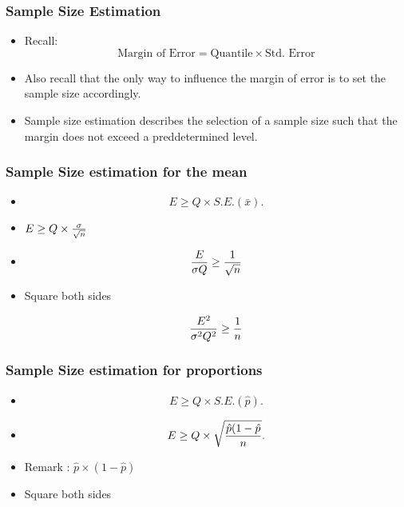 
\begin{frame}
\frametitle{Sample Size Estimation}

\begin{itemize} \item Recall:
\[  \mbox{Margin of Error}  = \mbox{Quantile} \times \mbox{Std. Error}\]

\item Also recall that the only way to influence the margin of error is to set the sample size accordingly.

\item Sample size estimation describes the selection of a sample size such that the margin does not exceed a preddetermined level.
\end{itemize}
\end{frame}

\begin{frame}
\frametitle{Sample Size estimation for the mean}

\begin{itemize}
\item \[ E \geq Q \times S.E.(\bar{x}). \]

\item 
$E \geq Q \times {\sigma \over \sqrt{n} }$

\item
\[ \frac{E}{\sigma Q} \geq {1 \over \sqrt{n} } \]

\item Square both sides


\[ \frac{E^2}{\sigma^2 Q^2} \geq {1 \over n } \]


\end{itemize}
\end{frame}

\begin{frame}
\frametitle{Sample Size estimation for proportions}

\begin{itemize}
\item \[ E \geq Q \times S.E.(\hat{p}). \]

\item 
\[ E \geq Q \times \sqrt{{\hat{p}(1-\hat{p} \over n}}. \]

\item Remark : $\hat{p} \times (1-\hat{p})$

\item Square both sides



\end{itemize}

\end{frame}

